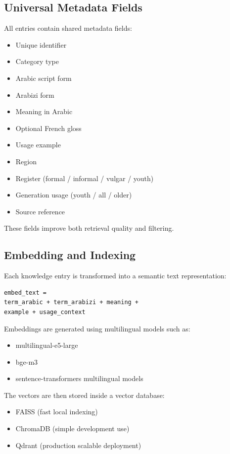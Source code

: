 \documentclass[12pt,a4paper]{report}
\begin{document}
\subsection{Universal Metadata Fields}

All entries contain shared metadata fields:

\begin{itemize}
    \item Unique identifier
    \item Category type
    \item Arabic script form
    \item Arabizi form
    \item Meaning in Arabic
    \item Optional French gloss
    \item Usage example
    \item Region
    \item Register (formal / informal / vulgar / youth)
    \item Generation usage (youth / all / older)
    \item Source reference
\end{itemize}

These fields improve both retrieval quality and filtering.

\subsection{Embedding and Indexing}

Each knowledge entry is transformed into a semantic text representation:

\begin{verbatim}
embed_text =
term_arabic + term_arabizi + meaning +
example + usage_context
\end{verbatim}

Embeddings are generated using multilingual models such as:

\begin{itemize}
    \item multilingual-e5-large
    \item bge-m3
    \item sentence-transformers multilingual models
\end{itemize}

The vectors are then stored inside a vector database:

\begin{itemize}
    \item FAISS (fast local indexing)
    \item ChromaDB (simple development use)
    \item Qdrant (production scalable deployment)
\end{itemize}
\end{document}
